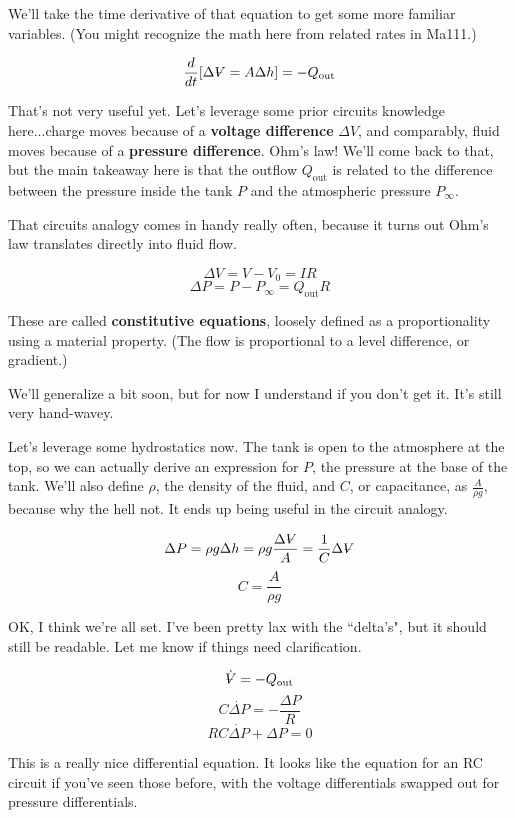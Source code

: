\documentclass{article}
\newcommand{\volume}{{\ooalign{\hfil$V$\hfil\cr\kern0.08em--\hfil\cr}}}
\begin{document}
\begin{onehalfspacing}
\begin{flushleft}
We'll take the time derivative of that equation to get some more familiar variables. (You might recognize the math here from related rates in Ma111.)

\[\frac{d}{dt} \qty[\Delta \volume = A \Delta h] = -Q_\text{out}\]

That's not very useful yet. Let's leverage some prior circuits knowledge here...charge moves because of a \textbf{voltage difference} \(\Delta V\), and comparably, fluid moves because of a \textbf{pressure difference}. Ohm's law! We'll come back to that, but the main takeaway here is that the outflow \(Q_\text{out}\) is related to the difference between the pressure inside the tank \(P\) and the atmospheric pressure \(P_\infty\).

\medskip

That circuits analogy comes in handy really often, because it turns out Ohm's law translates directly into fluid flow. 

\[\Delta V = V - V_0 = IR\]
\[\Delta P = P-P_\infty = Q_\text{out} R\]

These are called \textbf{constitutive equations}, loosely defined as a proportionality using a material property. (The flow is proportional to a level difference, or gradient.)

\medskip

We'll generalize a bit soon, but for now I understand if you don't get it. It's still very hand-wavey.

\medskip

Let's leverage some hydrostatics now. The tank is open to the atmosphere at the top, so we can actually derive an expression for \(P\), the pressure at the base of the tank. We'll also define \(\rho\), the density of the fluid, and \(C\), or capacitance, as \(\frac{A}{\rho g}\), because why the hell not. It ends up being useful in the circuit analogy.

\[\Delta P = \rho g \Delta h = \rho g \frac{\Delta \volume}{A} = \frac{1}{C} \Delta \volume\]
\[C = \frac{A}{\rho g}\]

OK, I think we're all set. I've been pretty lax with the ``delta's", but it should still be readable. Let me know if things need clarification.

\[\dot{\volume} = -Q_\text{out}\]
\[C \dot{\Delta P} = - \frac{\Delta P}{R}\]
\[\boxed{RC \dot{\Delta P} + {\Delta P} = 0}\]

This is a really nice differential equation. It looks like the equation for an RC circuit if you've seen those before, with the voltage differentials swapped out for pressure differentials.


\end{flushleft}
\end{onehalfspacing}
\end{document}
